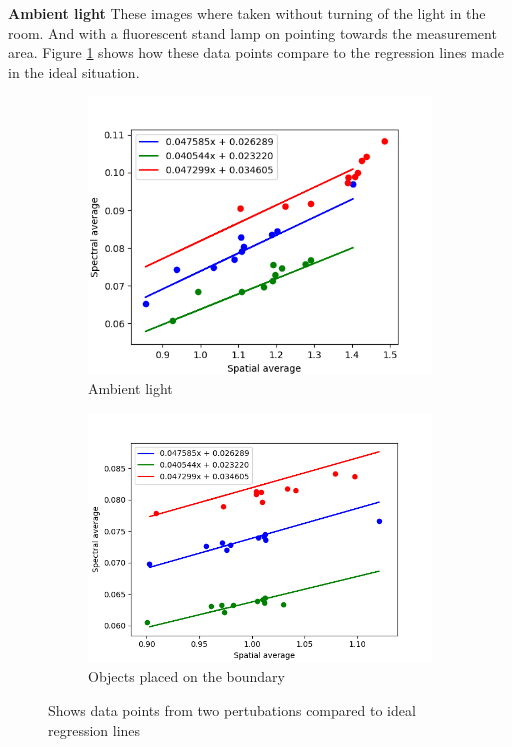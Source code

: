 \textbf{Ambient light}
These images where taken without turning of the light in the room. And with a fluorescent stand lamp on pointing towards the measurement area. Figure \ref{fig:ambient_light_plot} shows how these data points compare to the regression lines made in the ideal situation.

\begin{figure}[h]
    \begin{subfigure}{0.5\textwidth}
        \centering
        \includegraphics[width=0.9\linewidth]{Plots/spectral_vs_spatial_average_with_regression_ambient_light.png}
        \caption{Ambient light}
        \label{fig:ambient_light_plot}
    \end{subfigure}%
    \begin{subfigure}{0.5\textwidth}
        \centering
        \includegraphics[width=0.9\linewidth]{Plots/spectral_vs_spatial_average_with_regression_boundary_objects.png}
        \caption{Objects placed on the boundary}
        \label{fig:boundary_objects_plot}
    \end{subfigure}
    \caption{Shows data points from two pertubations compared to ideal regression lines}
\end{figure}


